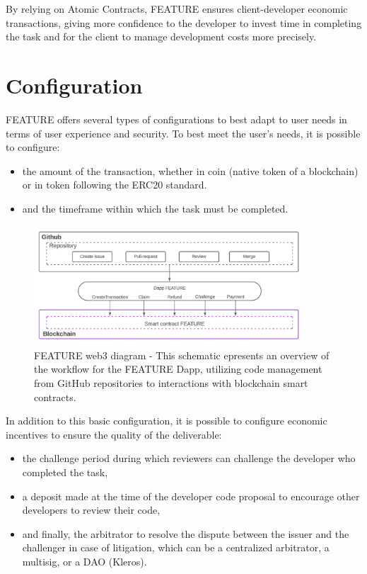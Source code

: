 \documentclass[
	a4paper, %
	10pt, %
	unnumberedsections, %
	twoside, %
]{LTJournalArticle}
\begin{document}
By relying on Atomic Contracts, FEATURE ensures client-developer economic transactions, giving more confidence to the developer to invest time in completing the task and for the client to manage development costs more precisely.


\section{Configuration}

FEATURE offers several types of configurations to best adapt to user needs in terms of user experience and security. To best meet the user's needs, it is possible to configure:

\begin{itemize}
\item
  the amount of the transaction, whether in coin (native token of a blockchain) or in token following the ERC20 standard.
\item
  and the timeframe within which the task must be completed.
\end{itemize}

\begin{figure}[ht]
  \centering
  \includegraphics[width=0.9\textwidth]{media/diagram_web3_Feature.png}
  \caption{FEATURE web3 diagram - This schematic epresents an overview of the workflow for the FEATURE Dapp, utilizing code management from GitHub repositories to interactions with blockchain smart contracts.}
  \label{fig:web3 diagram}
\end{figure}

In addition to this basic configuration, it is possible to configure economic incentives to ensure the quality of the deliverable:

\begin{itemize}
\item
  the challenge period during which reviewers can challenge the developer who completed the task,
\item
  a deposit made at the time of the developer code proposal to encourage other developers to review their code,
\item
  and finally, the arbitrator to resolve the dispute between the issuer and the challenger in case of litigation, which can be a centralized arbitrator, a multisig, or a DAO (Kleros).
\end{itemize}
\end{document}
